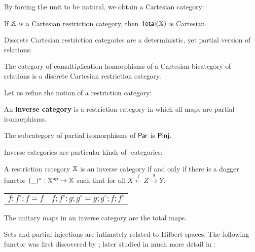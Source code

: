 By forcing the unit to be natural, we obtain a Cartesian category:

\begin{proposition} 
\label{prop:cartesian}
If $\mathbb{X}$ is a  Cartesian restriction category, then $\mathsf{Total}(\mathbb{X})$ is Cartesian.
\end{proposition}

Discrete Cartesian restriction categories are a deterministic, yet partial version of relations:

\begin{lemma}
The category of comultiplication homorphisms of a Cartesian bicategory of relations is a discrete Cartesian restriction category.
\end{lemma}

Let us refine the notion of a restriction category:

\begin{definition}
An {\bf inverse category} is a restriction category in which all maps are partial isomorphisms.
\end{definition}

\begin{example}
The subcategory of partial isomorphisms of $\mathsf{Par}$ is  $\mathsf{Pinj}$.
\end{example}

Inverse categories are particular kinds of \dag-categories:

\begin{theorem}
A restriction category $\mathbb{X}$ is an inverse category if and only if there is a dagger functor $(\_)^\circ:\mathbb{X}^{\mathsf{op}}\to\mathbb{X}$ such that for all $X\xleftarrow{f} Z \xrightarrow{g} Y$:
\begin{center}
\begin{tabular}{cc}
 $f; f^\circ ; f = f$ & 
 $f ; f ^\circ ;g; g^\circ = g;g^\circ ; f; f ^\circ $
\end{tabular}
\end{center}
\end{theorem}

The unitary maps in an inverse category are the total maps.


Sets and partial injections are intimately related to Hilbert spaces.  The following functor was first discovered by \cite{barr}; later studied in much more detail in \cite{elltwo}:

